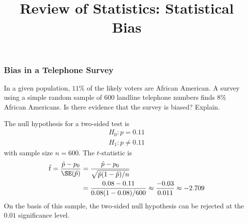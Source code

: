 \title[Probability]{Review of Statistics: Statistical Bias}
\date{}







\begin{frame}
\frametitle{Bias in a Telephone Survey}
In a given population, $11\%$ of the likely voters are African American. A survey using a simple random sample of $600$ landline telephone numbers finds $8\%$ African Americans. Is there evidence that the survey is biased? Explain.

\begin{answer}
The null hypothesis for a two-sided test is
\begin{align*}
H_0 \colon p = 0.11\\
H_1 \colon p \ne 0.11
\end{align*}
with sample size $n=600$. 
The $t$-statistic is
\begin{align*}
\hat{t}  
    = \frac{\hat{p}-p_{0}}{\SE(\hat{p})}
  & = \frac{\hat{p}-p_{0}}{\sqrt{\hat{p}(1-\hat{p})/n}}\\
  & = \frac{0.08-0.11}{0.08(1-0.08)/600}
   \approx \frac{-0.03}{0.011}
   \approx -2.709\\  
\end{align*}
On the basis of this sample, the two-sided null hypothesis can be rejected at the $0.01$ significance level. 
\end{answer}

\end{frame}



